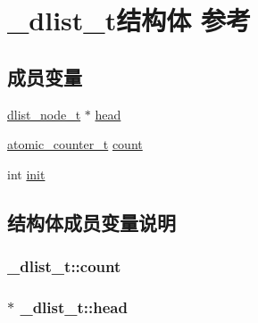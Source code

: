 \hypertarget{a00008}{}\section{\+\_\+dlist\+\_\+t结构体 参考}
\label{a00008}
\subsection*{成员变量}
\begin{DoxyCompactItemize}
\item 
\hyperlink{a00047_a62053232bcf3566010ef98a7d77c3cc8_a62053232bcf3566010ef98a7d77c3cc8}{dlist\+\_\+node\+\_\+t} $\ast$ \hyperlink{a00008_a0977afbac05b99991386bb9bd75a6fe2_a0977afbac05b99991386bb9bd75a6fe2}{head}
\item 
\hyperlink{a00047_a0d043bbb6b8db19fea54ab9271d352b6_a0d043bbb6b8db19fea54ab9271d352b6}{atomic\+\_\+counter\+\_\+t} \hyperlink{a00008_aa38de0ef086624e66baf0aa28accb45f_aa38de0ef086624e66baf0aa28accb45f}{count}
\item 
int \hyperlink{a00008_a3de2609af755cf6408f8d450b9bd7252_a3de2609af755cf6408f8d450b9bd7252}{init}
\end{DoxyCompactItemize}


\subsection{结构体成员变量说明}
\hypertarget{a00008_aa38de0ef086624e66baf0aa28accb45f_aa38de0ef086624e66baf0aa28accb45f}{}
\subsubsection[{count}]{ \+\_\+dlist\+\_\+t\+::count}\label{a00008_aa38de0ef086624e66baf0aa28accb45f_aa38de0ef086624e66baf0aa28accb45f}
\hypertarget{a00008_a0977afbac05b99991386bb9bd75a6fe2_a0977afbac05b99991386bb9bd75a6fe2}{}
\subsubsection[{head}]{$\ast$ \+\_\+dlist\+\_\+t\+::head}\label{a00008_a0977afbac05b99991386bb9bd75a6fe2_a0977afbac05b99991386bb9bd75a6fe2}
\hypertarget{a00008_a3de2609af755cf6408f8d450b9bd7252_a3de2609af755cf6408f8d450b9bd7252}{}
